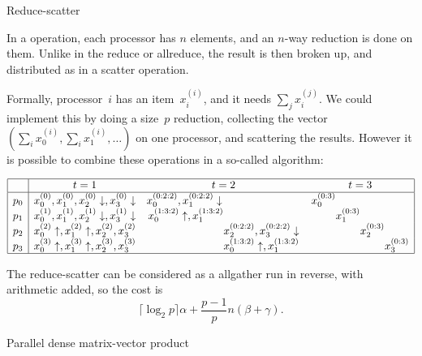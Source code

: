 
 {Reduce-scatter}

In a  operation, each processor has $n$
elements, and an $n$-way reduction is done on them. Unlike in the
reduce or allreduce, the result is then broken up, and distributed as
in a scatter operation.

Formally, processor~$i$ has an
item~$x_i^{(i)}$, and it needs $\sum_j x_i^{(j)}$. We could implement
this by doing a size~$p$ reduction, collecting the vector $(\sum_i
x_0^{(i)},\sum_i x_1^{(i)},\ldots)$ on one processor, and scattering
the results. However it is possible to combine these operations in a
so-called  algorithm:

\[
\begin{array}{|c|ccc|}
\hline
  &t=1&t=2&t=3\\ \hline
p_0&x_0^{(0)},x_1^{(0)},x_2^{(0)}\downarrow,x_3^{(0)}\downarrow
   &x_0^{(0:2:2)},x_1^{(0:2:2)}\downarrow
    \hphantom{x_0^{(0:2:2)},x_1^{(0:2:2)}\downarrow}
   &x_0^{(0:3)}
    \hphantom{x_3^{(0:3)}x_3^{(0:3)}x_3^{(0:3)}}\\
p_1&x_0^{(1)},x_1^{(1)},x_2^{(1)}\downarrow,x_3^{(1)}\downarrow
   &x_0^{(1:3:2)}\uparrow,x_1^{(1:3:2)}
    \hphantom{x_0^{(0:2:2)},x_1^{(0:2:2)}\downarrow}
   &\hphantom{x_3^{(0:3)}} x_1^{(0:3)}
    \hphantom{x_3^{(0:3)}x_3^{(0:3)}} \\
p_2&x_0^{(2)}\uparrow,x_1^{(2)}\uparrow,x_2^{(2)},x_3^{(2)}
   &\hphantom{x_0^{(0:2:2)},x_1^{(0:2:2)}\downarrow}
    x_2^{(0:2:2)},x_3^{(0:2:2)}\downarrow
   &\hphantom{x_3^{(0:3)}x_3^{(0:3)}} x_2^{(0:3)}
    \hphantom{x_3^{(0:3)}}\\
p_3&x_0^{(3)}\uparrow,x_1^{(3)}\uparrow,x_2^{(3)},x_3^{(3)}
   &\hphantom{x_0^{(0:2:2)},x_1^{(0:2:2)}\downarrow}
    x_0^{(1:3:2)}\uparrow,x_1^{(1:3:2)}
   &\hphantom{x_3^{(0:3)}x_3^{(0:3)}x_3^{(0:3)}}
    x_3^{(0:3)}\\
\hline
\end{array}
\]

The reduce-scatter can be considered as a allgather run in reverse,
with arithmetic added, so the cost is 
\[ \lceil \log_2 p\rceil\alpha +\frac{p-1}pn(\beta+\gamma). \]



 {Parallel dense matrix-vector product}
\label{sec:parallel-dense-mvp}

